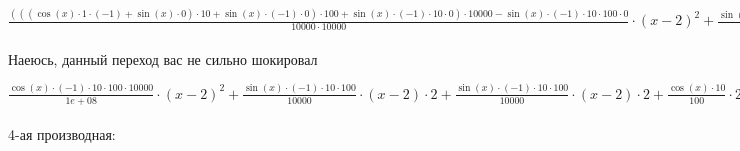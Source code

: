 \documentclass[a4paper, 12pt] {article}
\begin{document}
\begin{math}
 \frac {((( \cos (x) \cdot 1 \cdot (-1)+ \sin (x) \cdot 0) \cdot 10+ \sin (x) \cdot (-1) \cdot 0) \cdot 100+ \sin (x) \cdot (-1) \cdot 10 \cdot 0) \cdot 10000- \sin (x) \cdot (-1) \cdot 10 \cdot 100 \cdot 0}{10000 \cdot 10000} \cdot (x-2)^{2}+ \frac { \sin (x) \cdot (-1) \cdot 10 \cdot 100}{10000} \cdot 2 \cdot (x-2)^{1} \cdot (1-0)+ \frac {((-1) \cdot  \sin (x) \cdot 1 \cdot 10+ \cos (x) \cdot 0) \cdot 100- \cos (x) \cdot 10 \cdot 0}{100 \cdot 100} \cdot (x-2) \cdot 2+ \frac { \cos (x) \cdot 10}{100} \cdot ((1-0) \cdot 2+(x-2) \cdot 0)+ \frac {((-1) \cdot  \sin (x) \cdot 1 \cdot 10+ \cos (x) \cdot 0) \cdot 100- \cos (x) \cdot 10 \cdot 0}{100 \cdot 100} \cdot (x-2) \cdot 2+ \frac { \cos (x) \cdot 10}{100} \cdot ((1-0) \cdot 2+(x-2) \cdot 0)+ \frac { \cos (x) \cdot 1 \cdot 10- \sin (x) \cdot 0}{10 \cdot 10} \cdot 2+ \frac { \sin (x)}{10} \cdot 0
\end{math}
\\
\\
Наеюсь, данный переход вас не сильно шокировал

\begin{math}
 \frac { \cos (x) \cdot (-1) \cdot 10 \cdot 100 \cdot 10000}{1e+08} \cdot (x-2)^{2}+ \frac { \sin (x) \cdot (-1) \cdot 10 \cdot 100}{10000} \cdot (x-2) \cdot 2+ \frac { \sin (x) \cdot (-1) \cdot 10 \cdot 100}{10000} \cdot (x-2) \cdot 2+ \frac { \cos (x) \cdot 10}{100} \cdot 2+ \frac { \sin (x) \cdot (-1) \cdot 10 \cdot 100}{10000} \cdot (x-2) \cdot 2+ \frac { \cos (x) \cdot 10}{100} \cdot 2+ \frac { \cos (x) \cdot 10}{100} \cdot 2
\end{math}
\\
\\
4-ая производная:
\end{document}
